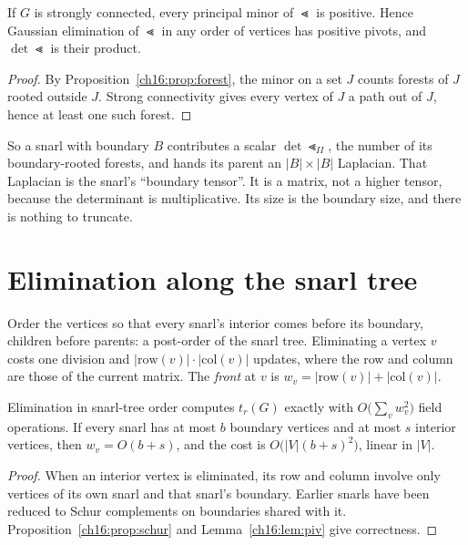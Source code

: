 \begin{lemma}[pivots]\label{ch16:lem:piv}
If $G$ is strongly connected, every principal minor of $\Lt$ is positive. Hence Gaussian elimination of
$\Lt$ in any order of vertices has positive pivots, and $\det\Lt$ is their product.
\end{lemma}

\begin{proof}
By Proposition~\ref{ch16:prop:forest}, the minor on a set $J$ counts forests of $J$ rooted outside $J$. Strong
connectivity gives every vertex of $J$ a path out of $J$, hence at least one such forest.
\end{proof}

So a snarl with boundary $B$ contributes a scalar $\det\Lt_{II}$, the number of its boundary-rooted
forests, and hands its parent an $|B|\times|B|$ Laplacian. That Laplacian is the snarl's ``boundary
tensor''. It is a matrix, not a higher tensor, because the determinant is multiplicative. Its size is the
boundary size, and there is nothing to truncate.

\section{Elimination along the snarl tree}\label{ch16:sec:tree}

Order the vertices so that every snarl's interior comes before its boundary, children before parents:
a post-order of the snarl tree. Eliminating a vertex $v$ costs one division and $|\mathrm{row}(v)|\cdot
|\mathrm{col}(v)|$ updates, where the row and column are those of the current matrix. The \emph{front} at
$v$ is $w_v=|\mathrm{row}(v)|+|\mathrm{col}(v)|$.

\begin{theorem}\label{ch16:thm:linear}
Elimination in snarl-tree order computes $t_r(G)$ exactly with $O\bigl(\sum_vw_v^2\bigr)$ field
operations. If every snarl has at most $b$ boundary vertices and at most $s$ interior vertices, then
$w_v=O(b+s)$, and the cost is $O\bigl(|V|(b+s)^2\bigr)$, linear in $|V|$.
\end{theorem}

\begin{proof}
When an interior vertex is eliminated, its row and column involve only vertices of its own snarl and
that snarl's boundary. Earlier snarls have been reduced to Schur complements on boundaries shared with
it. Proposition~\ref{ch16:prop:schur} and Lemma~\ref{ch16:lem:piv} give correctness.
\end{proof}

